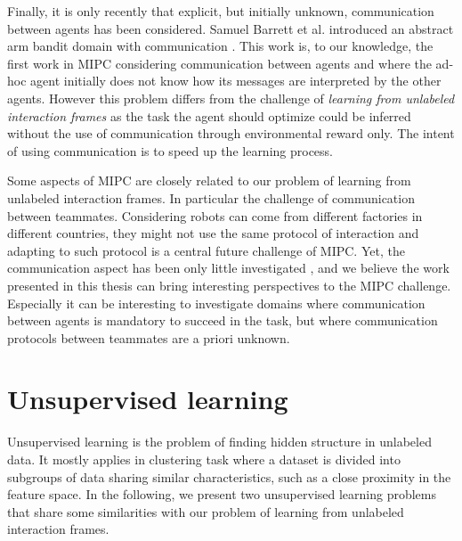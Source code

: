 Finally, it is only recently that explicit, but initially unknown, communication between agents has been considered. Samuel Barrett et al. introduced an abstract arm bandit domain with communication \cite{barrett2013communicating}. This work is, to our knowledge, the first work in MIPC considering communication between agents and where the ad-hoc agent initially does not know how its messages are interpreted by the other agents. However this problem differs from the challenge of \emph{learning from unlabeled interaction frames} as the task the agent should optimize could be inferred without the use of communication through environmental reward only. The intent of using communication is to speed up the learning process.

\transition

Some aspects of MIPC are closely related to our problem of learning from unlabeled interaction frames. In particular the challenge of communication between teammates. Considering robots can come from different factories in different countries, they might not use the same protocol of interaction and adapting to such protocol is a central future challenge of MIPC. Yet, the communication aspect has been only little investigated \cite{barrett2013communicating}, and we believe the work presented in this thesis can bring interesting perspectives to the MIPC challenge. Especially it can be interesting to investigate domains where communication between agents is mandatory to succeed in the task, but where communication protocols between teammates are a priori unknown.

\section{Unsupervised learning}

Unsupervised learning is the problem of finding hidden structure in unlabeled data. It mostly applies in clustering task where a dataset is divided into subgroups of data sharing similar characteristics, such as a close proximity in the feature space. In the following, we present two unsupervised learning problems that share some similarities with our problem of learning from unlabeled interaction frames.



